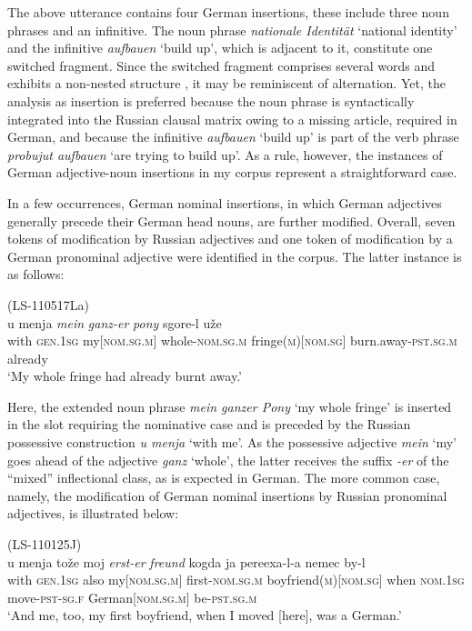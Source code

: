 \noindent The above utterance contains four German insertions, these include three noun phrases and an infinitive. The noun phrase \textit{nationale Identität} `national identity' and the infinitive \textit{aufbauen} `build up', which is adjacent to it, constitute one switched fragment. Since the switched fragment comprises several words and exhibits a non-nested structure \citep[cf.][97]{muysken-bilingual-2000}, it may be reminiscent of alternation. Yet, the analysis as insertion is preferred because the noun phrase is syntactically integrated into the Russian clausal matrix owing to a missing article, required in German, and because the infinitive \textit{aufbauen} ‘build up’ is part of the verb phrase \textit{probujut aufbauen} `are trying to build up'. As a rule, however, the instances of German adjective-noun insertions in my corpus represent a straightforward case. 

In a few occurrences, German nominal insertions, in which German adjectives generally precede their German head nouns, are further modified. Overall, seven tokens of modification by Russian adjectives and one token of modification by a German pronominal adjective were identified in the corpus. The latter instance is as follows:

\ea
\label{ex:4:27}
(LS-110517La)\\
\gll u menja \textit{mein} \textit{ganz-er} \textit{pony}  sgore-l uže\\
	with \textsc{gen.1sg} my[\textsc{nom.sg.m}] whole-\textsc{nom.sg.m} fringe(\textsc{m})[\textsc{nom.sg}] burn.away-\textsc{pst.sg.m} already\\
\glt `My whole fringe had already burnt away.'
\z

\noindent Here, the extended noun phrase \textit{mein ganzer Pony} `my whole fringe' is inserted in the slot requiring the nominative case and is preceded by the Russian possessive construction \textit{u menja} `with me'. As the possessive adjective \textit{mein} `my' goes ahead of the adjective \textit{ganz} `whole', the latter receives the suffix \textit{-er} of the “mixed” inflectional class, as is expected in German. The more common case, namely, the modification of German nominal insertions by Russian pronominal adjectives, is illustrated below:

\ea
\label{ex:4:28}
(LS-110125J)\\
 \gll u menja tože moj \textit{erst-er} \textit{freund}  kogda ja pereexa-l-a nemec by-l\\
	with \textsc{gen.1sg} also my[\textsc{nom.sg.m}] first-\textsc{nom.sg.m} boyfriend(\textsc{m})[\textsc{nom.sg}] when \textsc{nom.1sg} move-\textsc{pst-sg.f} German[\textsc{nom.sg.m}] be-\textsc{pst.sg.m}\\
\glt `And me, too, my first boyfriend, when I moved [here], was a German.'
\z

